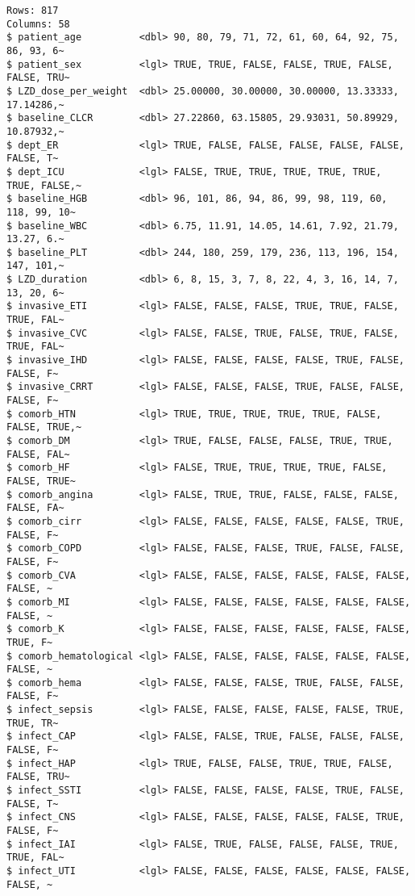 \documentclass[
  letterpaper,
  DIV=11,
  numbers=noendperiod]{scrartcl}
\begin{document}
\begin{verbatim}
Rows: 817
Columns: 58
$ patient_age          <dbl> 90, 80, 79, 71, 72, 61, 60, 64, 92, 75, 86, 93, 6~
$ patient_sex          <lgl> TRUE, TRUE, FALSE, FALSE, TRUE, FALSE, FALSE, TRU~
$ LZD_dose_per_weight  <dbl> 25.00000, 30.00000, 30.00000, 13.33333, 17.14286,~
$ baseline_CLCR        <dbl> 27.22860, 63.15805, 29.93031, 50.89929, 10.87932,~
$ dept_ER              <lgl> TRUE, FALSE, FALSE, FALSE, FALSE, FALSE, FALSE, T~
$ dept_ICU             <lgl> FALSE, TRUE, TRUE, TRUE, TRUE, TRUE, TRUE, FALSE,~
$ baseline_HGB         <dbl> 96, 101, 86, 94, 86, 99, 98, 119, 60, 118, 99, 10~
$ baseline_WBC         <dbl> 6.75, 11.91, 14.05, 14.61, 7.92, 21.79, 13.27, 6.~
$ baseline_PLT         <dbl> 244, 180, 259, 179, 236, 113, 196, 154, 147, 101,~
$ LZD_duration         <dbl> 6, 8, 15, 3, 7, 8, 22, 4, 3, 16, 14, 7, 13, 20, 6~
$ invasive_ETI         <lgl> FALSE, FALSE, FALSE, TRUE, TRUE, FALSE, TRUE, FAL~
$ invasive_CVC         <lgl> FALSE, FALSE, TRUE, FALSE, TRUE, FALSE, TRUE, FAL~
$ invasive_IHD         <lgl> FALSE, FALSE, FALSE, FALSE, TRUE, FALSE, FALSE, F~
$ invasive_CRRT        <lgl> FALSE, FALSE, FALSE, TRUE, FALSE, FALSE, FALSE, F~
$ comorb_HTN           <lgl> TRUE, TRUE, TRUE, TRUE, TRUE, FALSE, FALSE, TRUE,~
$ comorb_DM            <lgl> TRUE, FALSE, FALSE, FALSE, TRUE, TRUE, FALSE, FAL~
$ comorb_HF            <lgl> FALSE, TRUE, TRUE, TRUE, TRUE, FALSE, FALSE, TRUE~
$ comorb_angina        <lgl> FALSE, TRUE, TRUE, FALSE, FALSE, FALSE, FALSE, FA~
$ comorb_cirr          <lgl> FALSE, FALSE, FALSE, FALSE, FALSE, TRUE, FALSE, F~
$ comorb_COPD          <lgl> FALSE, FALSE, FALSE, TRUE, FALSE, FALSE, FALSE, F~
$ comorb_CVA           <lgl> FALSE, FALSE, FALSE, FALSE, FALSE, FALSE, FALSE, ~
$ comorb_MI            <lgl> FALSE, FALSE, FALSE, FALSE, FALSE, FALSE, FALSE, ~
$ comorb_K             <lgl> FALSE, FALSE, FALSE, FALSE, FALSE, FALSE, TRUE, F~
$ comorb_hematological <lgl> FALSE, FALSE, FALSE, FALSE, FALSE, FALSE, FALSE, ~
$ comorb_hema          <lgl> FALSE, FALSE, FALSE, TRUE, FALSE, FALSE, FALSE, F~
$ infect_sepsis        <lgl> FALSE, FALSE, FALSE, FALSE, FALSE, TRUE, TRUE, TR~
$ infect_CAP           <lgl> FALSE, FALSE, TRUE, FALSE, FALSE, FALSE, FALSE, F~
$ infect_HAP           <lgl> TRUE, FALSE, FALSE, TRUE, TRUE, FALSE, FALSE, TRU~
$ infect_SSTI          <lgl> FALSE, FALSE, FALSE, FALSE, TRUE, FALSE, FALSE, T~
$ infect_CNS           <lgl> FALSE, FALSE, FALSE, FALSE, FALSE, TRUE, FALSE, F~
$ infect_IAI           <lgl> FALSE, TRUE, FALSE, FALSE, FALSE, TRUE, TRUE, FAL~
$ infect_UTI           <lgl> FALSE, FALSE, FALSE, FALSE, FALSE, FALSE, FALSE, ~

\end{verbatim}
\end{document}
